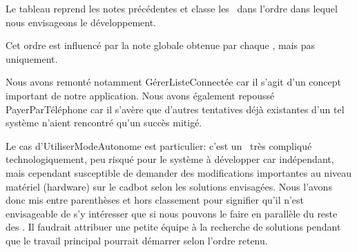Le tableau \in[CLASSEMENT] reprend les notes précédentes et classe les \cu\ dans l'ordre dans lequel nous envisageons le développement.
    
Cet ordre est influencé par la note globale obtenue par chaque \cu, mais pas uniquement. 
\par
Nous avons remonté notamment GérerListeConnectée car il s'agit d'un concept important de notre application. 
Nous avons également repoussé PayerParTéléphone car il s'avère que d'autres tentatives déjà existantes d'un tel système n'aient rencontré qu'un succès mitigé.
\par
Le cas d'UtiliserModeAutonome est particulier: c'est un \cu\ très compliqué technologiquement, peu risqué pour le système à développer car indépendant, mais cependant susceptible de demander des modifications importantes au niveau matériel (hardware) sur le cadbot selon les solutions envisagées.
Nous l'avons donc mis entre parenthèses et hors classement pour signifier qu'il n'est envisageable de s'y intéresser que si nous pouvons le faire en parallèle du reste des \cu. 
Il faudrait attribuer une petite équipe à la recherche de solutions pendant que le travail principal pourrait démarrer selon l'ordre retenu.
